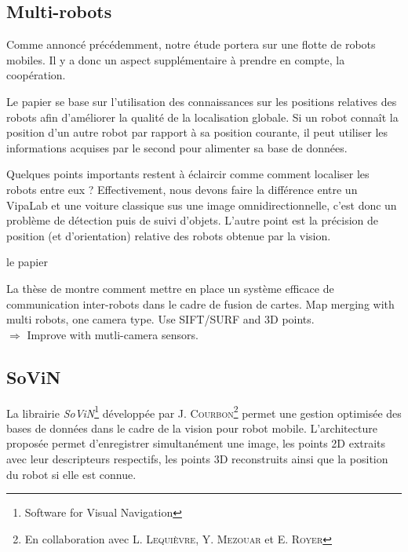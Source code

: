 \subsection{Multi-robots}

Comme annoncé précédemment, notre étude portera sur une flotte de robots mobiles.
Il y a donc un aspect supplémentaire à prendre en compte, la coopération.

Le papier \cite{Hukui10} se base sur l'utilisation des connaissances sur les positions relatives des robots afin d'améliorer la qualité de la localisation globale.
Si un robot connaît la position d'un autre robot par rapport à sa position courante, il peut utiliser les informations acquises par le second pour alimenter sa base de données.

Quelques points importants restent à éclaircir comme comment localiser les robots entre eux ?
Effectivement, nous devons faire la différence entre un VipaLab et une voiture classique sus une image omnidirectionnelle, c'est donc un problème de détection puis de suivi d'objets.
L'autre point est la précision de position (et d'orientation) relative des robots obtenue par la vision.



 le papier \cite{Howard06}


La thèse de \citeauthor{Aragues11PhD} \cite{Aragues11PhD} montre comment mettre en place un système efficace de communication inter-robots dans le cadre de fusion de cartes.
Map merging with multi robots, one camera type. Use SIFT/SURF and 3D points.\\
$\Rightarrow$ Improve with mutli-camera sensors. 



\subsection{SoViN}
\label{subsub:sovin}

       
La librairie \emph{SoViN}\footnote{Software for Visual Navigation} développée par J. \textsc{Courbon}\footnote{En collaboration avec L. \textsc{Lequièvre}, Y. \textsc{Mezouar} et E. \textsc{Royer}} permet une gestion optimisée des bases de données dans le cadre de la vision pour robot mobile.
L'architecture proposée permet d'enregistrer simultanément une image, les points 2D extraits avec leur descripteurs respectifs, les points 3D reconstruits ainsi que la position du robot si elle est connue.

